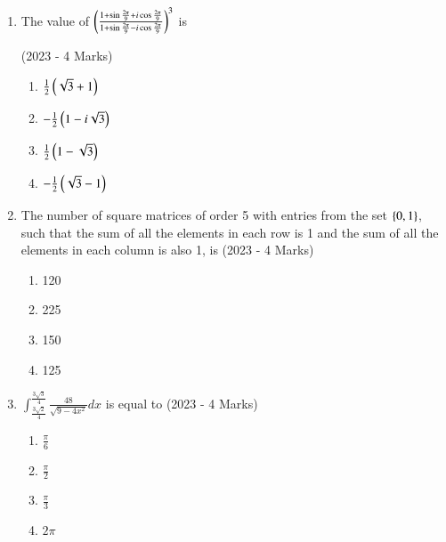 \documentclass[journal]{IEEEtran}
\begin{document}
\begin{enumerate}
{        %
        
        }
    \item{
	        	The value of $\left(\frac{1 + \sin{\frac{2\pi}{9}}+ i\cos{\frac{2\pi}{9}}}{1 + \sin{\frac{2\pi}{9}}- i\cos{\frac{2\pi}{9}}}\right)^3$ is 
            
             \hfill
                {(2023 - 4 Marks)}
            \begin{multicols}{2}
                \begin{enumerate}
                	\item $\frac{1}{2}\left(\sqrt{3}+1\right)$
                	\item $-\frac{1}{2}\left(1-i\sqrt{3}\right)$
                	\item $\frac{1}{2}\left(1-\sqrt{3}\right)$
                	\item $-\frac{1}{2}\left(\sqrt{3}-1\right)$
                \end{enumerate}
            \end{multicols}
        
        }
    \item{
    		
    		The number of square matrices of order 5 with entries from the set $\left\{0, 1\right\}$, such that the sum of all the elements in each row is 1 and the sum of all the elements in each column is also 1, is 
             \hfill
                {(2023 - 4 Marks)}
			\begin{multicols}{2}
				\begin{enumerate}
					\item 120
					\item 225
					\item 150
					\item 125
				\end{enumerate}
			\end{multicols}
        
        }
    \item{
        	$\int_{\frac{3\sqrt{2}}{4}}^ \frac{3\sqrt{3}}{4} \frac{48}{\sqrt{9-4x^2}}dx$ is equal to \hfill
                {(2023 - 4 Marks)}
				\begin{multicols}{4}
	                \begin{enumerate}
	                	\item $\frac{\pi}{6}$
	                	\item $\frac{\pi}{2}$
	                	\item $\frac{\pi}{3}$
	                	\item $2\pi$
	                \end{enumerate}
				\end{multicols}
        
}
\end{enumerate}
\end{document}
